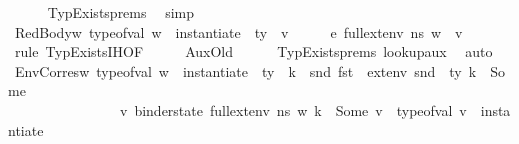 \begin{isabellebody}
\ \ \ \ \isamarkupfalse%
\ TypExists{\isachardot}{\kern0pt}prems{\isacharparenleft}{\kern0pt}{}{\isacharparenright}{\kern0pt}\ \isamarkupfalse%
\ simp\isanewline
\ \ \ \ \isamarkupfalse%
\isanewline
\ \ \isamarkupfalse%
\ RedBody{\isacharcolon}{\kern0pt}{\isachardoublequoteopen}{\isasymAnd}w{\isachardot}{\kern0pt}\ type{\isacharunderscore}{\kern0pt}of{\isacharunderscore}{\kern0pt}val\ w\ {\isacharequal}{\kern0pt}\ instantiate\ {\isasymOmega}\ ty\ {\isasymLongrightarrow}\ {\isasymexists}v{\isacharprime}{\kern0pt}{\isachardot}{\kern0pt}\ \ {\isasymLambda}{\isacharcomma}{\kern0pt}\ {\isasymGamma}{\isacharcomma}{\kern0pt}\ {\isasymOmega}\ {\isasymturnstile}\ {\isasymlangle}e{\isacharcomma}{\kern0pt}\ full{\isacharunderscore}{\kern0pt}ext{\isacharunderscore}{\kern0pt}env\ n{\isacharunderscore}{\kern0pt}s\ w{\isasymrangle}\ {\isasymDown}\ v{\isacharprime}{\kern0pt}{\isachardoublequoteclose}\ \isanewline
\ \ \ \ \isamarkupfalse%
\ {\isacharparenleft}{\kern0pt}rule\ TypExists{\isachardot}{\kern0pt}IH{\isacharparenleft}{\kern0pt}{}{\isacharparenright}{\kern0pt}{\isacharbrackleft}{\kern0pt}OF\ {\isacharunderscore}{\kern0pt}\ {\isacharunderscore}{\kern0pt}\ {\isacharunderscore}{\kern0pt}\ {\isacharunderscore}{\kern0pt}\ {\isacharunderscore}{\kern0pt}\ AuxOld{\isacharbrackright}{\kern0pt}{\isacharparenright}{\kern0pt}\isanewline
\ \ \ \ \isamarkupfalse%
\ TypExists{\isachardot}{\kern0pt}prems\ lookup{\isacharunderscore}{\kern0pt}aux\ \isamarkupfalse%
\ auto\isanewline
\ \ \isamarkupfalse%
\ EnvCorres{\isacharcolon}{\kern0pt}{\isachardoublequoteopen}{\isasymAnd}w{\isachardot}{\kern0pt}\ type{\isacharunderscore}{\kern0pt}of{\isacharunderscore}{\kern0pt}val\ w\ {\isacharequal}{\kern0pt}\ instantiate\ {\isasymOmega}\ ty\ {\isasymLongrightarrow}\ {\isasymforall}k\ {\isasymtau}{\isacharprime}{\kern0pt}{\isachardot}{\kern0pt}\ {\isacharparenleft}{\kern0pt}snd\ {\isacharparenleft}{\kern0pt}fst\ {\isasymDelta}{\isacharcomma}{\kern0pt}\ ext{\isacharunderscore}{\kern0pt}env\ {\isacharparenleft}{\kern0pt}snd\ {\isasymDelta}{\isacharparenright}{\kern0pt}\ ty{\isacharparenright}{\kern0pt}{\isacharparenright}{\kern0pt}\ k\ {\isacharequal}{\kern0pt}\ Some\ {\isasymtau}{\isacharprime}{\kern0pt}\ {\isasymlongrightarrow}\ \isanewline
\ \ \ \ \ \ \ \ \ \ \ \ \ \ \ \ {\isacharparenleft}{\kern0pt}{\isasymexists}v{\isachardot}{\kern0pt}\ binder{\isacharunderscore}{\kern0pt}state\ {\isacharparenleft}{\kern0pt}full{\isacharunderscore}{\kern0pt}ext{\isacharunderscore}{\kern0pt}env\ n{\isacharunderscore}{\kern0pt}s\ w{\isacharparenright}{\kern0pt}\ k\ {\isacharequal}{\kern0pt}\ Some\ v\ {\isasymand}\ type{\isacharunderscore}{\kern0pt}of{\isacharunderscore}{\kern0pt}val\ v\ {\isacharequal}{\kern0pt}\ instantiate\ {\isasymOmega}\ {\isasymtau}{\isacharprime}{\kern0pt}{\isacharparenright}{\kern0pt}{\isachardoublequoteclose}\isanewline

\end{isabellebody}
